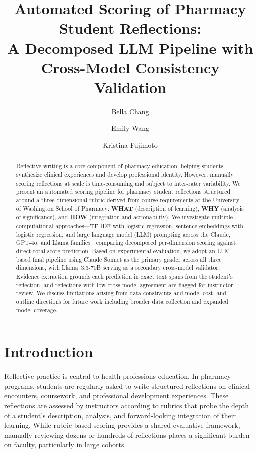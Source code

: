 \documentclass[11pt]{article}
\title{\textbf{Automated Scoring of Pharmacy Student Reflections:\\
A Decomposed LLM Pipeline with Cross-Model Consistency Validation}}
\author{
    Bella Chang \and Emily Wang \and Kristina Fujimoto\\[0.5em]
}
\date{}
\begin{document}
\maketitle

\begin{abstract}
Reflective writing is a core component of pharmacy education, helping students synthesize clinical experiences and develop professional identity. However, manually scoring reflections at scale is time-consuming and subject to inter-rater variability. We present an automated scoring pipeline for pharmacy student reflections structured around a three-dimensional rubric derived from course requirements at the University of Washington School of Pharmacy: \textbf{WHAT} (description of learning), \textbf{WHY} (analysis of significance), and \textbf{HOW} (integration and actionability). We investigate multiple computational approaches—TF-IDF with logistic regression, sentence embeddings with logistic regression, and large language model (LLM) prompting across the Claude, GPT-4o, and Llama families—comparing decomposed per-dimension scoring against direct total score prediction. Based on experimental evaluation, we adopt an LLM-based final pipeline using Claude Sonnet as the primary grader across all three dimensions, with Llama~3.3-70B serving as a secondary cross-model validator. Evidence extraction grounds each prediction in exact text spans from the student's reflection, and reflections with low cross-model agreement are flagged for instructor review. We discuss limitations arising from data constraints and model cost, and outline directions for future work including broader data collection and expanded model coverage.
\end{abstract}

\section{Introduction}

Reflective practice is central to health professions education. In pharmacy programs, students are regularly asked to write structured reflections on clinical encounters, coursework, and professional development experiences. These reflections are assessed by instructors according to rubrics that probe the depth of a student's description, analysis, and forward-looking integration of their learning. While rubric-based scoring provides a shared evaluative framework, manually reviewing dozens or hundreds of reflections places a significant burden on faculty, particularly in large cohorts.
\end{document}

